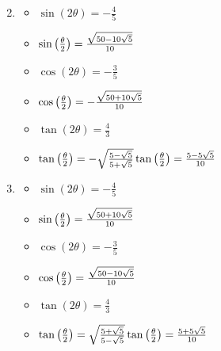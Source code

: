 \documentclass{ximera}
\begin{document}
\begin{enumerate}
\begin{multicols}{3}
\begin{itemize}
\end{itemize}

\end{multicols}

\item \begin{multicols}{3}

\begin{itemize}

\item $\sin(2\theta) = -\frac{4}{5}$
\item $\sin\left(\frac{\theta}{2}\right) = \frac{\sqrt{50-10\sqrt{5}}}{10} \\ \phantom{\tan\left(\frac{\theta}{2}\right) =\frac{5-5\sqrt{5}}{10}}$ 

\item $\cos(2\theta) = -\frac{3}{5}$
\item $\cos\left(\frac{\theta}{2}\right)= -\frac{\sqrt{50+10\sqrt{5}}}{10} \\ \phantom{\tan\left(\frac{\theta}{2}\right) =\frac{5-5\sqrt{5}}{10}}$ 
\item $\tan(2\theta)=\frac{4}{3}$
\item $\tan\left(\frac{\theta}{2}\right) =  -\sqrt{\frac{5-\sqrt{5}}{5+\sqrt{5}}} \\ \tan\left(\frac{\theta}{2}\right) =\frac{5-5\sqrt{5}}{10}$

\end{itemize}

\end{multicols}

\item \begin{multicols}{3}

\begin{itemize}

\item $\sin(2\theta) = -\frac{4}{5}$
\item $\sin\left(\frac{\theta}{2}\right) = \frac{\sqrt{50+10\sqrt{5}}}{10} \\ \phantom{\tan\left(\frac{\theta}{2}\right) =\frac{5-5\sqrt{5}}{10}}$ 

\item $\cos(2\theta) = -\frac{3}{5}$
\item $\cos\left(\frac{\theta}{2}\right)= \frac{\sqrt{50-10\sqrt{5}}}{10} \\ \phantom{\tan\left(\frac{\theta}{2}\right) =\frac{5-5\sqrt{5}}{10}}$ 
\item $\tan(2\theta)=\frac{4}{3}$
\item $\tan\left(\frac{\theta}{2}\right) =  \sqrt{\frac{5+\sqrt{5}}{5-\sqrt{5}}} \\ \tan\left(\frac{\theta}{2}\right) =\frac{5+5\sqrt{5}}{10}$

\end{itemize}

\end{multicols}

\setcounter{HW}{\value{enumi}}

\end{enumerate}
\end{document}
